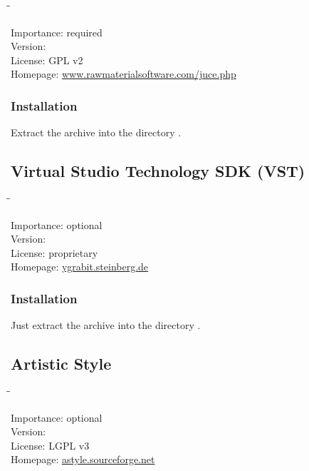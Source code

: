 \begin{tabbing}
  \hspace*{6em}\=\=\kill

  Importance:  \> required \\
  Version:      \\
  License:     \> GPL v2 \\
  Homepage:    \> \href{http://www.rawmaterialsoftware.com/juce.php}{www.rawmaterialsoftware.com/juce.php}
\end{tabbing}

\subsubsection{Installation}

Extract the archive into the directory .

\subsection{Virtual Studio Technology SDK (VST)}

\begin{tabbing}
  \hspace*{6em}\=\=\kill

  Importance:  \> optional \\
  Version:      \\
  License:     \> proprietary \\
  Homepage:    \> \href{http://ygrabit.steinberg.de/}{ygrabit.steinberg.de}
\end{tabbing}

\subsubsection{Installation}

Just extract the archive into the directory
.

\subsection{Artistic Style}

\begin{tabbing}
  \hspace*{6em}\=\=\kill

  Importance:  \> optional \\
  Version:      \\
  License:     \> LGPL v3 \\
  Homepage:    \> \href{http://astyle.sourceforge.net/}{astyle.sourceforge.net}
\end{tabbing}

